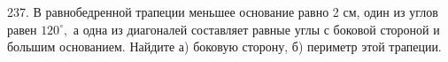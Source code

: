 237. В равнобедренной трапеции меньшее основание равно 2 см, один из углов равен $120^\circ,$ а одна из диагоналей составляет равные углы с боковой стороной и большим основанием. Найдите а) боковую сторону, б) периметр этой трапеции.\\
